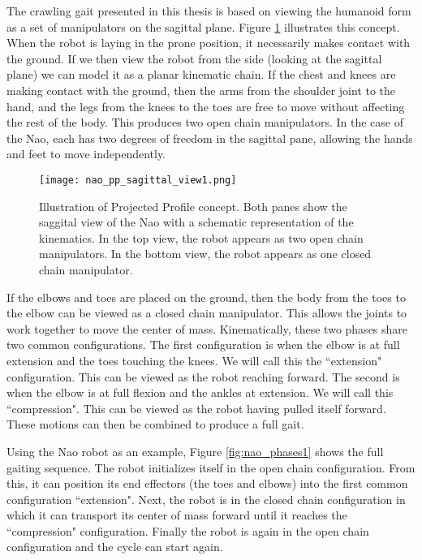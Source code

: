 The crawling gait presented in this thesis is based on viewing the humanoid form as a set of manipulators on the
sagittal plane. Figure \ref{fig:nao_sideview1} illustrates this concept.
When the robot is laying in the prone position, it necessarily makes contact with the ground. If we then view the robot
from the side (looking at the sagittal plane) we can model it as a planar kinematic chain. If the chest and knees
are making contact with the ground, then the arms from the shoulder joint to the hand, and the legs from the knees to the
toes are free to move without affecting the rest of the body. This produces two open chain manipulators. In the case of the Nao, each has two degrees
of freedom in the sagittal pane, allowing the hands and feet to move independently.
\begin{figure}
	\centering
	\texttt{[image: nao\_pp\_sagittal\_view1.png]}
	\caption
	{Illustration of Projected Profile concept. Both panes show the saggital view of the Nao with a schematic representation of the kinematics. 
	In the top view, the robot appears as two open chain manipulators. In the bottom view, the robot appears as one closed chain manipulator.}
	\label{fig:nao_sideview1}
\end{figure}

If the elbows and toes are placed on the ground, then the body from the toes to the elbow can be viewed as a closed chain manipulator.
This allows the joints to work together to move the center of mass. Kinematically, these two phases share two common configurations.
The first configuration is when the elbow is at full extension and the toes touching the knees. We will call this the ``extension" configuration.
This can be viewed as the robot reaching forward. The second is when the elbow is at full flexion and the ankles at extension.
We will call this ``compression".
This can be viewed as the robot having pulled itself forward. These motions can then be combined
to produce a full gait.

Using the Nao robot as an example, Figure \ref{fig:nao_phases1} shows the full gaiting sequence.
The robot initializes itself in the open chain configuration. From this, it can position
its end effectors (the toes and elbows) into the first common configuration ``extension". Next, the robot is in the closed chain 
configuration in which it can transport its center of mass forward until it reaches the ``compression" configuration. Finally the robot
is again in the open chain configuration and the cycle can start again.

